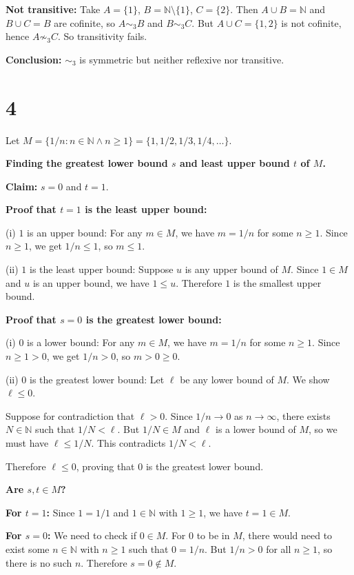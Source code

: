 \documentclass[12pt,a4paper]{article}
\theoremstyle{definition}
\theoremstyle{remark}
\begin{document}
\textbf{Not transitive:} Take $A = \{1\}$, $B = \mathbb{N}\setminus\{1\}$, $C = \{2\}$. Then $A\cup B = \mathbb{N}$ and $B\cup C = B$ are cofinite, so $A \sim_3 B$ and $B \sim_3 C$. But $A\cup C = \{1,2\}$ is not cofinite, hence $A \not\sim_3 C$. So transitivity fails.

\textbf{Conclusion:} $\sim_3$ is symmetric but neither reflexive nor transitive.

\section*{4}

Let $M = \{1/n : n \in \mathbb{N} \land n \geq 1\} = \{1, 1/2, 1/3, 1/4, \ldots\}$.

\textbf{Finding the greatest lower bound $s$ and least upper bound $t$ of $M$.}

\textbf{Claim:} $s = 0$ and $t = 1$.

\textbf{Proof that $t = 1$ is the least upper bound:}

(i) $1$ is an upper bound: For any $m \in M$, we have $m = 1/n$ for some $n \geq 1$. Since $n \geq 1$, we get $1/n \leq 1$, so $m \leq 1$.

(ii) $1$ is the least upper bound: Suppose $u$ is any upper bound of $M$. Since $1 \in M$ and $u$ is an upper bound, we have $1 \leq u$. Therefore $1$ is the smallest upper bound.

\textbf{Proof that $s = 0$ is the greatest lower bound:}

(i) $0$ is a lower bound: For any $m \in M$, we have $m = 1/n$ for some $n \geq 1$. Since $n \geq 1 > 0$, we get $1/n > 0$, so $m > 0 \geq 0$.

(ii) $0$ is the greatest lower bound: Let $\ell$ be any lower bound of $M$. We show $\ell \leq 0$. 

Suppose for contradiction that $\ell > 0$. Since $1/n \to 0$ as $n \to \infty$, there exists $N \in \mathbb{N}$ such that $1/N < \ell$. But $1/N \in M$ and $\ell$ is a lower bound of $M$, so we must have $\ell \leq 1/N$. This contradicts $1/N < \ell$.

Therefore $\ell \leq 0$, proving that $0$ is the greatest lower bound.

\textbf{Are $s, t \in M$?}

\textbf{For $t = 1$:} Since $1 = 1/1$ and $1 \in \mathbb{N}$ with $1 \geq 1$, we have $t = 1 \in M$.

\textbf{For $s = 0$:} We need to check if $0 \in M$. For $0$ to be in $M$, there would need to exist some $n \in \mathbb{N}$ with $n \geq 1$ such that $0 = 1/n$. But $1/n > 0$ for all $n \geq 1$, so there is no such $n$. Therefore $s = 0 \notin M$.
\end{document}
